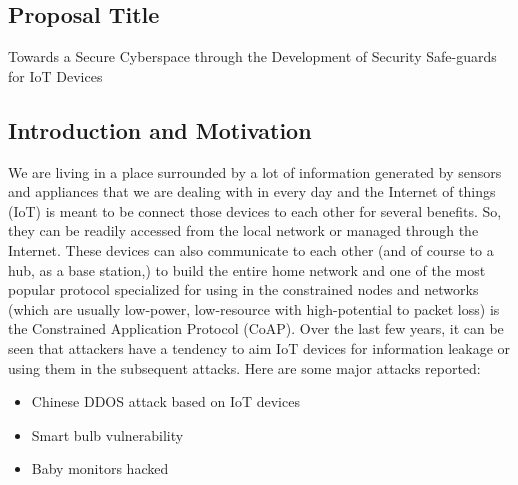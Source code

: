 \documentclass[10pt,a4paper]{article}
\begin{document}
\subsection*{Proposal Title} 
Towards a Secure Cyberspace through the Development of Security Safe-guards for IoT Devices

\subsection*{Introduction and Motivation} 
We are living in a place surrounded by a lot of information generated by sensors and appliances that we are dealing with in every day and the Internet of things (IoT) is meant to be connect those devices to each other for several benefits. So, they can be readily accessed from the local network or managed through the Internet. These devices can also communicate to each other (and of course to a hub, as a base station,) to build the entire home network and one of the most popular protocol specialized for using in the constrained nodes and networks (which are usually low-power, low-resource with high-potential to packet loss) is the Constrained Application Protocol (CoAP). Over the last few years, it can be seen that attackers have a tendency to aim IoT devices for  information leakage or using them in the subsequent attacks. Here are some major attacks reported:
\begin{itemize}
\item Chinese DDOS attack based on IoT devices \cite{ChineseDDoS}
\item Smart bulb vulnerability \cite{OsramSmartBulbs}
\item Baby monitors hacked \cite{BabyMonitors}
\end{itemize}
\end{document}
